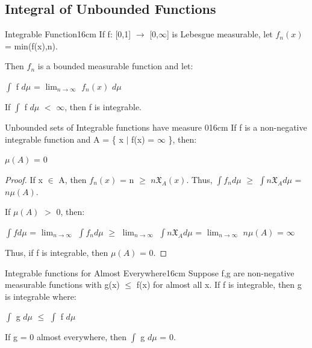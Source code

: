     \newpage



    
\subsection{ Integral of Unbounded Functions }

    \begin{definition}{Integrable Function}{16cm}
        If f: [0,1] $\rightarrow$ [0,$\infty$] is Lebesgue measurable,
        let $f_n(x)$ = min(f(x),n).

        Then $f_n$ is a bounded measurable function and let:

        \hspace{0.5cm}
        $\int$ f $d\mu$ = $\lim_{n \rightarrow \infty}$ $f_n(x)$ $d\mu$

        If $\int$ f $d\mu$ $<$ $\infty$, then f is {\color{lblue} integrable}.
    \end{definition}

    \vspace{0.5cm}



    \begin{wtheorem}{Unbounded sets of Integrable functions have measure 0}{16cm}
        If f is a non-negative integrable function and
        A = \{ x $|$ f(x) = $\infty$ \}, then:
        
        \hspace{0.5cm}
        $\mu(A)$ = 0 
    \end{wtheorem}

    \begin{proof}
        If x $\in$ A, then $f_n(x)$ = n $\geq$ $n \mathfrak{X}_A(x)$.
        Thus, $\int f_n d\mu$ $\geq$ $\int n \mathfrak{X}_A d\mu$ = $n\mu(A)$.

        If $\mu(A)$ $>$ 0, then:

        \hspace{0.5cm}
        $\int f d\mu$
        = $\lim_{n \rightarrow \infty}$ $\int f_n d\mu$
        $\geq$ $\lim_{n \rightarrow \infty}$ $\int n \mathfrak{X}_A d\mu$
        = $\lim_{n \rightarrow \infty}$ $n\mu(A)$
        = $\infty$

        Thus, if f is integrable, then $\mu(A)$ = 0.
    \end{proof}

    \vspace{0.5cm}



    \begin{wtheorem}{Integrable functions for Almost Everywhere}{16cm}
        Suppose f,g are non-negative measurable functions with g(x) $\leq$ f(x)
        for almost all x. If f is integrable, then g is integrable where:

        \hspace{0.5cm}
        $\int$ g $d\mu$
        $\leq$ $\int$ f $d\mu$

        If g = 0 almost everywhere, then $\int$ g $d\mu$ = 0.
    \end{wtheorem}


